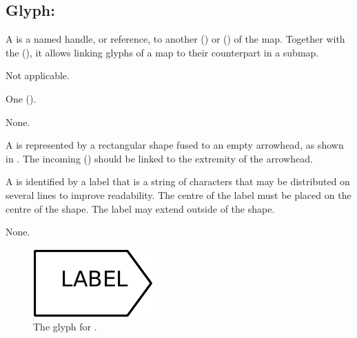 
\subsection{Glyph: }
\label{sec:tag}

A  is a named handle, or reference, to another  () or  () of the map.
Together with the  (), it allows linking glyphs of a map to their counterpart in a submap.

\begin{glyphDescription}

\glyphSboTerm Not applicable.


\glyphIncoming
One  ().



\glyphOutgoing
None.


\glyphContainer A  is represented by a rectangular shape fused to an empty arrowhead, as shown in .
The incoming  () should be linked to the extremity of the arrowhead.

\glyphLabel A  is identified by a label that is  a string of characters that may be distributed on several lines to improve readability.
The centre of the label must be placed on the centre of the shape.
The label may extend outside of the shape.

\glyphAux 
None.

\end{glyphDescription}

\begin{figure}[H]
  \centering
  \includegraphics{images/build/tag.pdf}
  \caption{The \PD glyph for .}
  \label{fig:tag}
\end{figure}
